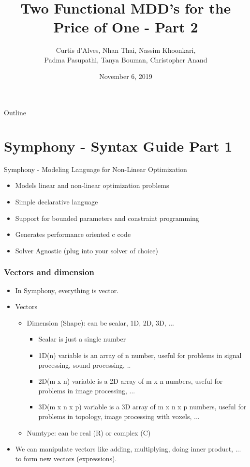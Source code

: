 \documentclass[presentation]{beamer}
\author{Curtis d'Alves, Nhan Thai, Nassim Khoonkari, \\ Padma Pasupathi, Tanya Bouman, Christopher Anand}
\date{November 6, 2019}
\title{Two Functional MDD's for the Price of One - Part 2}
\begin{document}
\maketitle
\begin{frame}{Outline}
\tableofcontents
\end{frame}


\section{Symphony - Syntax Guide Part 1}
\label{sec:org5ab5078}
\begin{frame}[label={sec:org5cb1731}]{Symphony - Modeling Language for Non-Linear Optimization}
\begin{itemize}
\item Models linear and non-linear optimization problems
\item Simple declarative language
\item Support for bounded parameters and constraint programming
\item Generates performance oriented c code
\item Solver Agnostic (plug into your solver of choice)
\end{itemize}
\end{frame}

\begin{frame}
  \frametitle{Vectors and dimension}
  \begin{itemize}
    \item In Symphony, everything is vector.
    \item Vectors
      \begin{itemize}
    \item Dimension (Shape): can be scalar, 1D, 2D, 3D, ...
      \begin{itemize}
      \item Scalar is just a single number 
      \item 1D(n) variable is an array of n number, useful for problems in signal processing, sound processing, ..
      \item 2D(m x n) variable is a 2D array of m x n numbers, useful for problems in image processing, ...
      \item 3D(m x n x p) variable is a 3D array of m x n x p numbers, useful for
        problems in topology, image processing with voxels, ...
      \end{itemize}
    \item Numtype: can be real (R) or complex (C)
      \end{itemize}
    \item We can manipulate vectors like adding, multiplying, doing inner product, ... to form new vectors (expressions).
  \end{itemize}
\end{frame}
\end{document}
